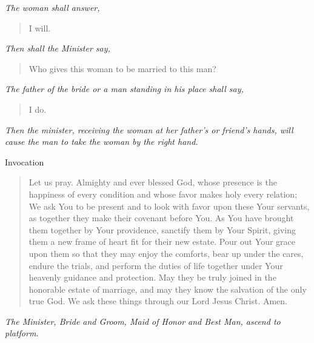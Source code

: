 \documentclass[
]{book}
\begin{document}
\begin{center}
\emph{The woman shall answer,}

\end{center}

\begin{quote}
I will.
\end{quote}

\begin{center}
\emph{Then shall the Minister say,}

\end{center}

\begin{quote}
Who gives this woman to be married to this man?
\end{quote}

\begin{center}
\emph{The father of the bride or a man standing in his place shall say,}

\end{center}

\begin{quote}
I do.
\end{quote}

\begin{center}
\emph{Then the minister, receiving the woman at her father's or friend's hands, will cause the man to take the woman by the right hand.}

\end{center}

Invocation

\begin{quote}
Let us pray. Almighty and ever blessed God, whose presence is the happiness of every condition and whose favor makes holy every relation; We ask You to be present and to look with favor upon these Your servants, as together they make their covenant before You. As You have brought them together by Your providence, sanctify them by Your Spirit, giving them a new frame of heart fit for their new estate. Pour out Your grace upon them so that they may enjoy the comforts, bear up under the cares, endure the trials, and perform the duties of life together under Your heavenly guidance and protection. May they be truly joined in the honorable estate of marriage, and may they know the salvation of the only true God. We ask these things through our Lord Jesus Christ. Amen.
\end{quote}

\begin{center}
\emph{The Minister, Bride and Groom, Maid of Honor and Best Man, ascend to platform.}

\end{center}
\end{document}
